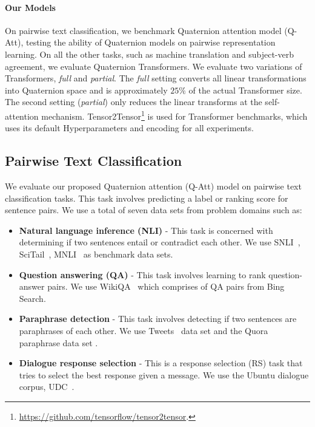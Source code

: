 \documentclass[11pt,a4paper]{article}
\begin{document}
 \paragraph{Our Models} On pairwise text classification, we benchmark Quaternion attention model (Q-Att), testing the ability of Quaternion models on pairwise representation learning. On all the other tasks, such as machine translation and subject-verb agreement, we evaluate Quaternion Transformers. We evaluate two variations of Transformers, \emph{full} and \emph{partial}. The \emph{full} setting converts all linear transformations into Quaternion space and is approximately $25\%$ of the actual Transformer size. The second setting (\emph{partial}) only reduces the linear transforms at the self-attention mechanism. Tensor2Tensor\footnote{\url{https://github.com/tensorflow/tensor2tensor}.} is used for Transformer benchmarks, which uses its default Hyperparameters and encoding for all experiments.


\subsection{Pairwise Text Classification}
We evaluate our proposed Quaternion attention (Q-Att) model on pairwise text classification tasks. This task involves predicting a label or ranking score for sentence pairs. We use a total of seven data sets from problem domains such as:
\begin{itemize}
    \item \textbf{Natural language inference (NLI)} - This task is concerned with determining if two sentences entail or contradict each other. We use SNLI~\cite{bowman2015large}, SciTail~\cite{khot2018scitail}, MNLI~\cite{williams2017broad} as benchmark data sets.
    \item \textbf{Question answering (QA)} - This task involves learning to rank question-answer pairs. We use WikiQA~\cite{yang2015wikiqa} which comprises of QA pairs from Bing Search.
    \item \textbf{Paraphrase detection} - This task involves detecting if two sentences are paraphrases of each other. We use Tweets~\cite{lan2017continuously} data set and the Quora paraphrase data set \cite{wang2017bilateral}.
    \item \textbf{Dialogue response selection} - This is a response selection (RS) task that tries to select the best response given a message. We use the Ubuntu dialogue corpus, UDC~\cite{lowe2015ubuntu}.
\end{itemize}
\end{document}
